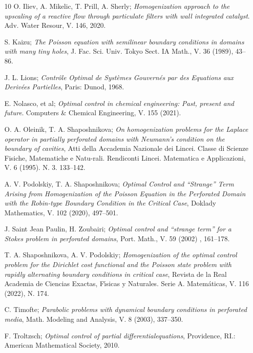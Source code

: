 \documentclass[reqno]{amsart}
\begin{document}
\begin{thebibliography}{10}
 O. Iliev, A. Mikelic, T. Prill, A. Sherly;
\emph{Homogenization approach to the upscaling of a reactive flow through
particulate filters with wall integrated catalyst}. Adv. Water Resour, V. 146,
2020.

 S. Kaizu;
\emph{The Poisson equation with semilinear boundary
conditions in domains with many tiny holes},
 J. Fac. Sci. Univ. Tokyo Sect. IA Math., V. 36 (1989), 43--86.

 J. L. Lions;
\emph{Contr\^{o}le Optimal de Syst\`{e}mes Gouvern\'{e}s par des Equations 
aux Deriv\'{e}es Partielles}, Paris: Dunod, 1968.

 E. Nolasco, et al;
\emph{Optimal control in chemical engineering: Past, present and future}. 
Computers \& Chemical Engineering, V. 155 (2021).

 O. A. Oleinik, T. A. Shaposhnikova;
\emph{On homogenization problems for the Laplace operator in partially 
perforated domains with Neumann's condition on the boundary of cavities}, 
Atti della Accademia Nazionale dei Lincei. Classe di Scienze Fisiche, 
Matematiche e Natu-rali.
Rendiconti Lincei. Matematica e Applicazioni, V. 6 (1995). N. 3. 133--142.

 A. V. Podolskiy, T. A. Shaposhnikova;
\emph{Optimal Control and ``Strange'' Term Arising from Homogenization of the Poisson 
Equation in the Perforated Domain with the Robin-type Boundary Condition in the Critical
Case}, Doklady Mathematics, V. 102 (2020), 497--501.

 J. Saint Jean Paulin, H. Zoubairi;
\emph{Optimal control and ``strange term''  for a Stokes problem in
perforated domains}, Port. Math., V. 59 (2002) , 161--178.

T. A. Shaposhnikova, A. V. Podolskiy;
\emph{Homogenization of the optimal control problem for the Dirichlet
cost functional and the Poisson state problem with rapidly alternating
boundary conditions in critical case}, Revista de la Real Academia de
Ciencias Exactas, F\'{\i}sicas y Naturales. Serie A. Matem\'{a}ticas, V.
116 (2022), N. 174.

 C. Timofte;
\emph{Parabolic problems with dynamical boundary
conditions in perforated media}, 
Math. Modeling and Analysis, V. 8 (2003), 337--350.

 F. Troltzsch;
\emph{Optimal control of partial differentialequations}, 
Providence, RI.: American Mathematical Society, 2010.


\end{thebibliography}
\end{document}
